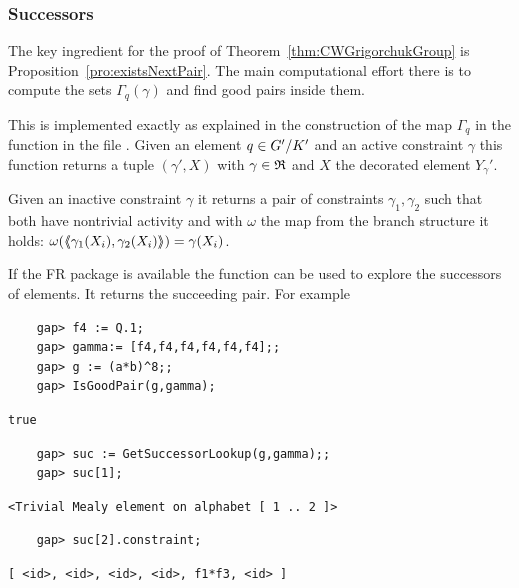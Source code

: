 \documentclass[a4paper,11pt]{amsart}
\begin{document}
\subsubsection{Successors}
The key ingredient for the proof of
Theorem~\ref{thm:CWGrigorchukGroup} is
Proposition~\ref{pro:existsNextPair}. The main computational effort
there is to compute the sets $\Gamma_q(\gamma)$ and find good pairs
inside them.

This is implemented exactly as explained in the construction of the map
$\Gamma_q$ in the function  in the file 
. Given an element $q\in{G'/K'}$ 
and an active constraint $\gamma$ this function returns a tuple $(\gamma',X)$ 
with $\gamma\in\mathfrak{R}$ and $X$ the decorated element $Y_\gamma'$.

Given an inactive constraint $\gamma$ it returns a pair of constraints
$\gamma_1,\gamma_2$ such that both have nontrivial activity and with
$\omega$ the map from the branch structure it holds:
$\omega(\langle\negthickspace\langle\gamma_1(X_i),\gamma_2(X_i)\rangle\negthickspace\rangle)=\gamma(X_i)$. 

If the FR package is available
the function  can be used to explore the
successors of elements. It returns the succeeding pair. For example
 \begin{lstlisting}
    gap> f4 := Q.1;
    gap> gamma:= [f4,f4,f4,f4,f4,f4];;
    gap> g := (a*b)^8;;
    gap> IsGoodPair(g,gamma);
\end{lstlisting}
\begin{verbatim}
true
\end{verbatim} 
\begin{lstlisting}
    gap> suc := GetSuccessorLookup(g,gamma);;    
    gap> suc[1];
\end{lstlisting}
\begin{verbatim}
<Trivial Mealy element on alphabet [ 1 .. 2 ]>
\end{verbatim} 
\begin{lstlisting}
    gap> suc[2].constraint;
\end{lstlisting}
\begin{verbatim}
[ <id>, <id>, <id>, <id>, f1*f3, <id> ]
\end{verbatim} 





\appendix
% 
%
\end{document}
